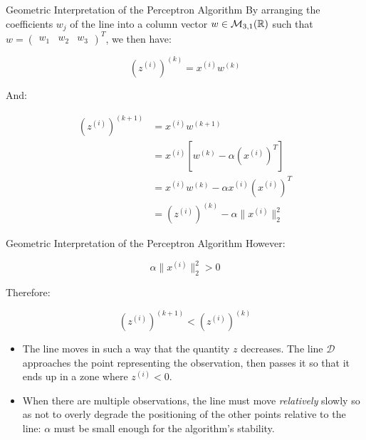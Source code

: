 \begin{frame}{Geometric Interpretation of the Perceptron Algorithm}
	By arranging the coefficients $w_j$ of the line into a column vector $w \in \mathcal{M}_{3,1}(\mathbb{R})$ such that $w = \begin{pmatrix} w_1 & w_2 & w_3 \end{pmatrix}^T$, we then have:
	
	\begin{equation*}
		\left(z^{(i)}\right)^{(k)} = x^{(i)}  w^{(k)}
	\end{equation*}
	
	And:
	
	\begin{equation*}
		\begin{aligned}
			\left(z^{(i)}\right)^{(k+1)} 
			&= x^{(i)} w^{(k+1)} \\
			&= x^{(i)} \left[w^{(k)} - \alpha \left(x^{(i)}\right)^T\right] \\
			&= x^{(i)} w^{(k)} - \alpha x^{(i)} \left(x^{(i)}\right)^T \\
			&= \left(z^{(i)}\right)^{(k)} - \alpha \| x^{(i)} \|_2^2
		\end{aligned}
	\end{equation*}
	
\end{frame}

\begin{frame}{Geometric Interpretation of the Perceptron Algorithm}
	However:
	
	\begin{equation*}
		\alpha \| x^{(i)} \|_2^2 > 0
	\end{equation*}	
	
	Therefore:
	
	\begin{equation*}
		\left(z^{(i)}\right)^{(k+1)} < \left(z^{(i)}\right)^{(k)}
	\end{equation*}
	
	\begin{itemize}
		\item The line moves in such a way that the quantity $z$ decreases. The line $\mathcal{D}$ approaches the point representing the observation, then passes it so that it ends up in a zone where $z^{(i)} < 0$.
		\item When there are multiple observations, the line must move \textit{relatively} slowly so as not to overly degrade the positioning of the other points relative to the line: $\alpha$ must be small enough for the algorithm's stability.
	\end{itemize}
\end{frame}


